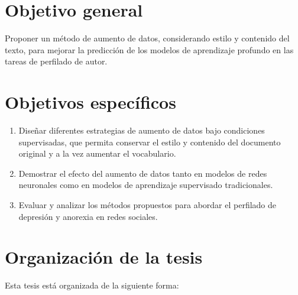 \section{Objetivo general}

Proponer un método de aumento de datos, considerando estilo y contenido del texto, para mejorar la predicción de los modelos de aprendizaje profundo en las tareas de perfilado de autor.


\section{Objetivos específicos}
\begin{enumerate}
    \item Diseñar diferentes estrategias de aumento de datos bajo condiciones supervisadas, que permita conservar el estilo y contenido del documento original y a la vez aumentar el vocabulario.
    \item Demostrar el efecto del aumento de datos tanto en modelos de redes neuronales como en modelos de aprendizaje supervisado tradicionales.
    \item Evaluar y analizar los métodos propuestos para abordar el perfilado de depresión y anorexia en redes sociales.
 
\end{enumerate}

\section{Organización de la tesis}

Esta tesis está organizada de la siguiente forma: 



